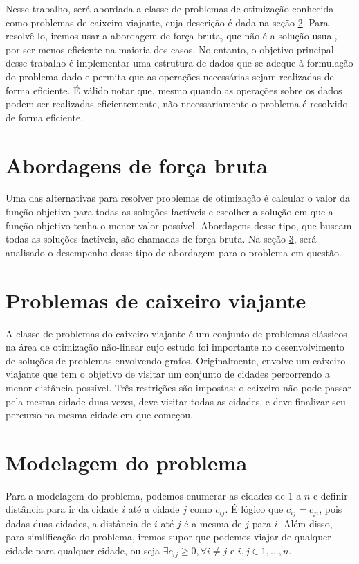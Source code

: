 \documentclass[a4paper, 12pt]{article} %
\begin{document}
	Nesse trabalho, será abordada a classe de problemas de otimização conhecida como problemas de caixeiro viajante, cuja descrição é dada na seção \ref{sec:description}. Para resolvê-lo, iremos usar a abordagem de força bruta, que não é a solução usual, por ser menos eficiente na maioria dos casos. No entanto, o objetivo principal desse trabalho é implementar uma estrutura de dados que se adeque à formulação do problema dado e permita que as operações necessárias sejam realizadas de forma eficiente. É válido notar que, mesmo quando as operações sobre os dados podem ser realizadas eficientemente, não necessariamente o problema é resolvido de forma eficiente.
		
	\section{Abordagens de força bruta}
	
	Uma das alternativas para resolver problemas de otimização é calcular o valor da função objetivo para todas as soluções factíveis e escolher a solução em que a função objetivo tenha o menor valor possível. Abordagens desse tipo, que buscam todas as soluções factíveis, são chamadas de força bruta. Na seção \ref{sec:modelagem}, será analisado o desempenho desse tipo de abordagem para o problema em questão.

	\section{Problemas de caixeiro viajante} \label{sec:description}
	A classe de problemas do caixeiro-viajante é um conjunto de problemas clássicos na área de otimização não-linear cujo estudo foi importante no desenvolvimento de soluções de problemas envolvendo grafos. Originalmente, envolve um caixeiro-viajante que tem o objetivo de visitar um conjunto de cidades percorrendo a menor distância possível. Três restrições são impostas: o caixeiro não pode passar pela mesma cidade duas vezes, deve visitar todas as cidades, e deve finalizar seu percurso na mesma cidade em que começou.
	
	\section{Modelagem do problema} \label{sec:modelagem}
	Para a modelagem do problema, podemos enumerar as cidades de $1$ a $n$ e definir distância para ir da cidade $i$ até a cidade $j$ como $c_{ij}$. É lógico que $c_{ij} = c_{ji}$, pois dadas duas cidades, a distância de $i$ até $j$ é a mesma de $j$ para $i$. Além disso, para simlificação do problema, iremos supor que podemos viajar de qualquer cidade para qualquer cidade, ou seja $\exists c_{ij} \geq 0, \forall i \neq j$ e $i,j \in {1, ..., n}$.
	
\end{document}
